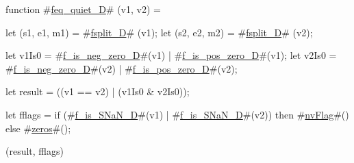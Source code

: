 function #\hyperref[sailRISCVzfeqzyquietzyD]{feq\_quiet\_D}#   (v1,       v2) = {
  let (s1, e1, m1) = #\hyperref[sailRISCVzfsplitzyD]{fsplit\_D}# (v1);
  let (s2, e2, m2) = #\hyperref[sailRISCVzfsplitzyD]{fsplit\_D}# (v2);

  let v1Is0    = #\hyperref[sailRISCVzfzyiszynegzyzzerozyD]{f\_is\_neg\_zero\_D}#(v1) | #\hyperref[sailRISCVzfzyiszyposzyzzerozyD]{f\_is\_pos\_zero\_D}#(v1);
  let v2Is0    = #\hyperref[sailRISCVzfzyiszynegzyzzerozyD]{f\_is\_neg\_zero\_D}#(v2) | #\hyperref[sailRISCVzfzyiszyposzyzzerozyD]{f\_is\_pos\_zero\_D}#(v2);

  let result = ((v1 == v2) | (v1Is0 & v2Is0));

  let fflags = if   (#\hyperref[sailRISCVzfzyiszySNaNzyD]{f\_is\_SNaN\_D}#(v1) | #\hyperref[sailRISCVzfzyiszySNaNzyD]{f\_is\_SNaN\_D}#(v2))
               then #\hyperref[sailRISCVznvFlag]{nvFlag}#()
               else #\hyperref[sailRISCVzzzeros]{zeros}#();

  (result, fflags)
}
